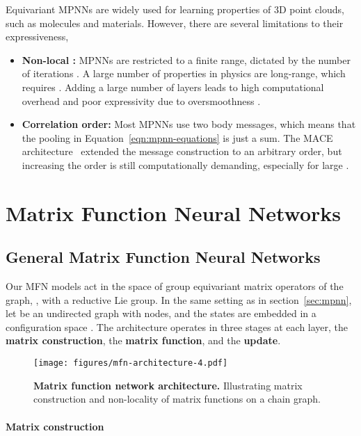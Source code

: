 \documentclass{article} \usepackage{iclr2024_conference,times}
\begin{document}
Equivariant MPNNs are widely used for learning properties of 3D point clouds, such as molecules and materials. However, there are several limitations to their expressiveness,
\begin{itemize}
    \item \textbf{Non-local :} MPNNs are restricted to a finite range, dictated by the number of iterations .
    A large number of properties in physics are long-range, which requires . Adding a large number of layers leads to high computational overhead and poor expressivity due to oversmoothness \citep{di2023over}.
    \item \textbf{Correlation order:} Most MPNNs use two body messages, which means that the pooling in Equation~\ref{eqn:mpnn-equations} is just a sum. The MACE architecture~\citep{Batatia2022mace} extended the message construction to an arbitrary order, but increasing the order is still computationally demanding, especially for large .
\end{itemize}

\section{Matrix Function Neural Networks}
\vspace{-6pt}
\label{sec:mfnns}
\subsection{General Matrix Function Neural Networks}
\vspace{-6pt}
Our MFN models act in the space of group equivariant matrix operators of the graph, , with  a reductive Lie group. In the same setting as in section~\ref{sec:mpnn}, let  be an undirected graph with  nodes, and the states  are embedded in a configuration space . The architecture operates in three stages at each layer, the \textbf{matrix construction}, the \textbf{matrix function}, and the \textbf{update}.
\begin{figure}[tp]
    \centering
    \texttt{[image: figures/mfn-architecture-4.pdf]}
    \label{fig:enter-label}
	\caption{\textbf{Matrix function network architecture.} Illustrating matrix construction and non-locality of matrix functions on a chain graph.}
    \label{fig:MFN-framework}
    \vspace{-16pt}
\end{figure}
\vspace{-5pt}
\paragraph{Matrix construction}
\end{document}
